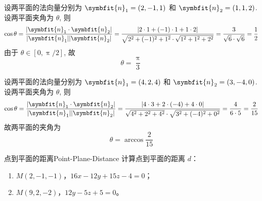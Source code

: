 \begin{solution}
    设两平面的法向量分别为 $\symbfit{n}_1 = (2, -1, 1)$ 和 $\symbfit{n}_2 = (1, 1, 2)$. 设两平面夹角为 $\theta$, 则
    \begin{equation*}
        \cos \theta = \frac{|\symbfit{n}_1 \cdot \symbfit{n}_2|}{|\symbfit{n}_1||\symbfit{n}_2|} = \frac{|2 \cdot 1 + (-1) \cdot 1 + 1 \cdot 2|}{\sqrt{2^2 + (-1)^2 + 1^2} \cdot \sqrt{1^2 + 1^2 + 2^2}} = \frac{3}{\sqrt{6} \cdot \sqrt{6}} = \frac{1}{2}
    \end{equation*}
    由于 $\theta \in [0, \uppi/2]$, 故
    \begin{equation*}
        \boxed{\theta = \frac{\uppi}{3}}
    \end{equation*}

    设两平面的法向量分别为 $\symbfit{n}_1 = (4, 2, 4)$ 和 $\symbfit{n}_2 = (3, -4, 0)$. 设两平面夹角为 $\theta$, 则
    \begin{equation*}
        \cos \theta = \frac{|\symbfit{n}_1 \cdot \symbfit{n}_2|}{|\symbfit{n}_1||\symbfit{n}_2|} = \frac{|4 \cdot 3 + 2 \cdot (-4) + 4 \cdot 0|}{\sqrt{4^2 + 2^2 + 4^2} \cdot \sqrt{3^2 + (-4)^2 + 0^2}} = \frac{4}{6 \cdot 5} = \frac{2}{15}
    \end{equation*}
    故两平面的夹角为
    \begin{equation*}
        \boxed{\theta = \arccos \frac{2}{15}}
    \end{equation*}
\end{solution}


\begin{problem}{点到平面的距离}{Point-Plane-Distance}
    计算点到平面的距离 $d$：
    \begin{enumerate}
        \item $M(2, -1, -1)$，$16x - 12y + 15z - 4 = 0$；
        \item $M(9, 2, -2)$，$12y - 5z + 5 = 0$。
    \end{enumerate}
\end{problem}

